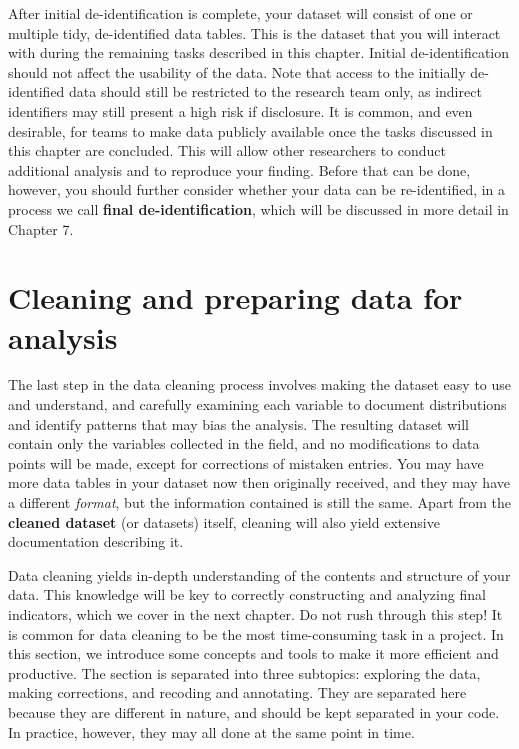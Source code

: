 After initial de-identification is complete,
your dataset will consist of one or multiple tidy,
de-identified data tables.
This is the dataset that you will interact with
during the remaining tasks described in this chapter.
Initial de-identification should not affect the usability of the data.
Note that access to the initially de-identified data
should still be restricted to the research team only,
as indirect identifiers may still present a high risk if disclosure.
It is common, and even desirable, for teams to make data publicly available
once the tasks discussed in this chapter are concluded.
This will allow other researchers to conduct additional analysis and to reproduce your finding.
Before that can be done, however,
you should further consider whether your data can be re-identified,
in a process we call \textbf{final de-identification},
which will be discussed in more detail in Chapter 7.


\section{Cleaning and preparing data for analysis}

The last step in the data cleaning process involves
making the dataset easy to use and understand, and
carefully examining each variable to document distributions
and identify patterns that may bias the analysis.
The resulting dataset will contain only the variables collected in the field, and
no modifications to data points will be made,
except for corrections of mistaken entries.
You may have more data tables in your dataset now then originally received,
and they may have a different \textit{format},
but the information contained is still the same.
Apart from the \textbf{cleaned dataset} (or datasets) itself,
cleaning will also yield extensive documentation describing it.

Data cleaning yields in-depth understanding of the contents and structure of your data.
This knowledge will be key to correctly constructing and analyzing final indicators,
which we cover in the next chapter.
Do not rush through this step!
It is common for data cleaning to be the most time-consuming task in a project.
In this section, we introduce some concepts and tools to make it more efficient and productive.
The section is separated into three subtopics:
exploring the data, making corrections, and recoding and annotating.
They are separated here because they are different in nature,
and should be kept separated in your code.
In practice, however, they may all done at the same point in time.


